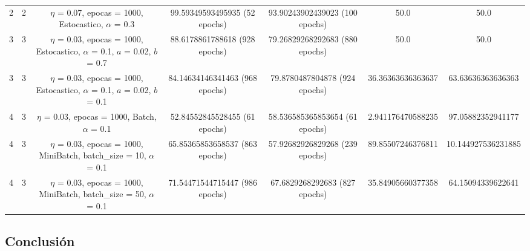 \begin{table}[h!]
\begin{tabular}{c|c|c|c|c|c|c}
		2 & 2 & $\eta$ = 0.07, epocas = 1000, Estocastico, $\alpha$ = 0.3 & 99.59349593495935 (52 epochs) & 93.90243902439023 (100 epochs) &  50.0 & 50.0 \\
		3 & 3 & $\eta$ = 0.03, epocas = 1000, Estocastico, $\alpha$ = 0.1, $a$ = 0.02, $b$ = 0.7 & 88.6178861788618 (928 epochs) & 79.26829268292683 (880 epochs) &  50.0 & 50.0 \\
		3 & 3 & $\eta$ = 0.03, epocas = 1000, Estocastico, $\alpha$ = 0.1, $a$ = 0.02, $b$ = 0.1 & 84.14634146341463 (968 epochs) & 79.8780487804878 (924 epochs) &  36.36363636363637 & 63.63636363636363 \\
		4 & 3 & $\eta$ = 0.03, epocas = 1000, Batch, $\alpha$ = 0.1 & 52.84552845528455 (61 epochs) & 58.536585365853654 (61 epochs) &  2.941176470588235 & 97.05882352941177 \\
		4 & 3 & $\eta$ = 0.03, epocas = 1000, MiniBatch, batch\_size = 10, $\alpha$ = 0.1 & 65.85365853658537 (863 epochs) & 57.92682926829268 (239 epochs) &  89.85507246376811 & 10.144927536231885 \\
		4 & 3 & $\eta$ = 0.03, epocas = 1000, MiniBatch, batch\_size = 50, $\alpha$ = 0.1 & 71.54471544715447 (986 epochs) & 67.6829268292683 (827 epochs) &  35.84905660377358 & 64.15094339622641 \\
	\end{tabular}
\end{table}



\subsection{Conclusión}

\newpage
